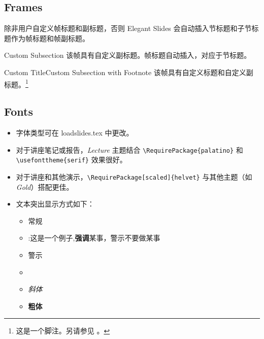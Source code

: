 \documentclass[
    11pt,
    notheorems,
    hyperref={pdfauthor=whatever}
]{beamer}
\begin{document}
\subsection{Frames}
\begin{frame}
    除非用户自定义帧标题和副标题，否则 Elegant Slides 会自动插入节标题和子节标题作为帧标题和帧副标题。
\end{frame}

\begin{frame}{}{Custom Subsection}
    该帧具有自定义副标题。帧标题自动插入，对应于节标题。
\end{frame}

\begin{frame}{Custom Title}{Custom Subsection with Footnote}
    该帧具有自定义标题和自定义副标题。\footnote{这是一个脚注。另请参见 \citet{example_2022}。}
\end{frame}

\subsection{Fonts}
\begin{frame}[fragile]
    \begin{itemize}
        \item 字体类型可在 loadslides.tex 中更改。
        \item 对于讲座笔记或报告，\textit{Lecture} 主题结合 \verb+\RequirePackage{palatino}+ 和 \verb+\usefonttheme{serif}+ 效果很好。
        \item 对于讲座和其他演示，\verb+\RequirePackage[scaled]{helvet}+ 与其他主题（如 \textit{Gold}）搭配更佳。
        \item 文本突出显示方式如下：
        \begin{itemize}
            \item 常规
            \item {}:这是一个例子,\textbf{强调}某事，\alert{警示}不要做某事
            \item \alert{警示}
            \item {}
            \item \textit{斜体}
            \item \textbf{粗体}
        \end{itemize}
    \end{itemize}
\end{frame}

\end{document}
